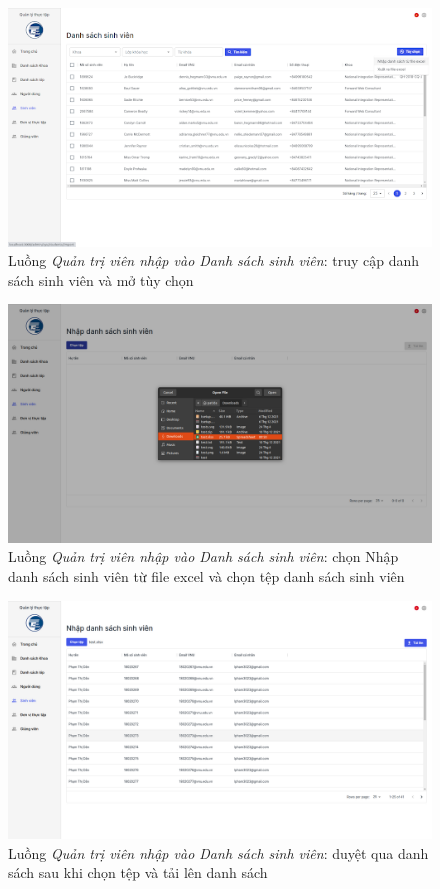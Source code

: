 \documentclass[./../main.tex]{subfiles}
\begin{document}
\begin{figure}[]
	\includegraphics[width=\linewidth]{./images/image68.png}
	\caption{Luồng \emph{Quản trị viên nhập vào Danh sách sinh viên}: truy cập danh sách sinh viên và mở tùy chọn}
	\label{fig:admin_access_list_students}
\end{figure}

\begin{figure}[]
	\includegraphics[width=\linewidth]{./images/image27.png}
	\caption{Luồng \emph{Quản trị viên nhập vào Danh sách sinh viên}: chọn Nhập danh sách sinh viên từ file excel và chọn tệp danh sách sinh viên}
	\label{fig:choose_file}
\end{figure}

\begin{figure}[]
	\includegraphics[width=\linewidth]{./images/image28.png}
	\caption{Luồng \emph{Quản trị viên nhập vào Danh sách sinh viên}: duyệt qua danh sách sau khi chọn tệp và tải lên danh sách}
	\label{fig:upload_list}
\end{figure}
\end{document}
